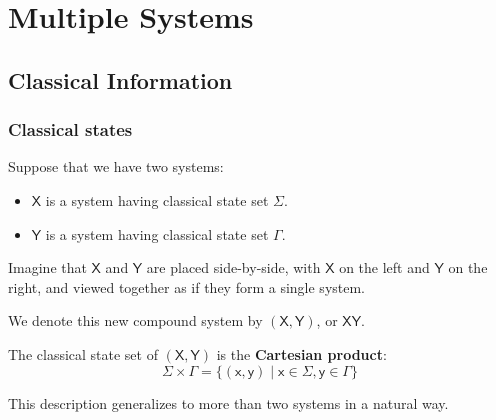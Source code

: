 \chapter{Multiple Systems}
\section{Classical Information}
\subsection{Classical states}
Suppose that we have two systems:
\begin{itemize}
    \item $\mathsf{X}$ is a system having classical state set $\Sigma$.
    \item $\mathsf{Y}$ is a system having classical state set $\Gamma$.
\end{itemize}
Imagine that $\mathsf{X}$ and $\mathsf{Y}$ are placed side-by-side, with $\mathsf{X}$ on the left and $\mathsf{Y}$ on the right, and viewed together as if they form a single system.

\bigbreak

We denote this new compound system by $(\mathsf{X},\mathsf{Y})$, or $\mathsf{XY}$.

\begin{sol}
    The classical state set of $(\mathsf{X},\mathsf{Y})$ is the \textbf{Cartesian product}:
    \begin{equation*}
        \Sigma \times \Gamma = \{(\mathsf{x},\mathsf{y}) \mid \mathsf{x} \in \Sigma, \mathsf{y} \in \Gamma\}
    \end{equation*}
\end{sol}


\raggedright
This description generalizes to more than two systems in a natural way.

